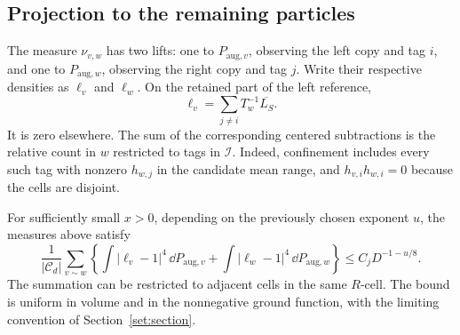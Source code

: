 \subsection{Projection to the remaining particles}

The measure $\nu_{v,w}$ has two lifts: one to
$P_{\mathrm{aug},v}$, observing the left copy and tag $i$, and one
to $P_{\mathrm{aug},w}$, observing the right copy and tag $j$.
Write their respective densities as $\ell_v$ and $\ell_w$.
On the retained part of the left reference,
\begin{equation}\label{palm:lift-density}
       \ell_v=\sum_{j\ne i}T_w^{-1}\overline{L_S}.
\end{equation}
It is zero elsewhere.  The sum of the corresponding centered
subtractions is the relative count in $w$ restricted to tags in $\mathcal I$.
Indeed, confinement includes every such tag with nonzero $h_{w,j}$
in the candidate mean range, and $h_{v,i}h_{w,i}=0$ because the cells
are disjoint.

\begin{proposition}
\label{palm:augmented-comparison}
For sufficiently small $x>0$, depending on the previously chosen
exponent $u$, the measures above satisfy
\begin{equation}\label{palm:augmented-fourth}
 \frac1{|\mathcal C_d|}\sum_{v\sim w}
     \left\{\int|\ell_v-1|^4\,\dd P_{\mathrm{aug},v}
          +\int|\ell_w-1|^4\,\dd P_{\mathrm{aug},w}\right\}
       \le C_jD^{-1-u/8}.
\end{equation}
The summation can be restricted to adjacent cells in the same $R$-cell.
The bound is uniform in volume and in the nonnegative ground function,
with the limiting convention of Section~\ref{set:section}.
\end{proposition}

